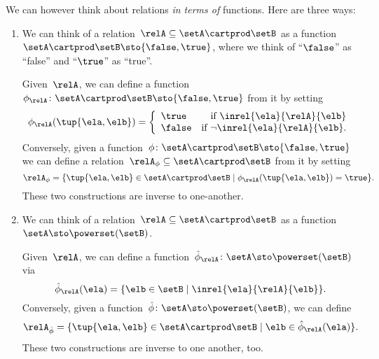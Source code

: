 \begin{remark}
    \label{re:rel-three-fun-descriptions}
    We can however think about relations \emph{in terms of} functions. Here are three ways:
    \begin{enumerate}
        \item We can think of a relation~$\relA \subseteq \setA \cartprod\setB$ as a function~$\setA \cartprod \setB \sto \{ \false, \true \}$, where we think of ``$\false$'' as ``false'' and ``$\true$'' as ``true''.
        
        Given~$\relA$, we can define a function~$\phi_{\relA} \colon \setA \cartprod \setB \sto \{ \false, \true \}$ from it by setting
        \begin{equation}
            \phi_{\relA}(\tup{\ela, \elb}) =
            \left
            \{\begin{array}{lr}
                  \true  & \text{if } \inrel{\ela}{\relA}{\elb}      \\
                  \false & \text{if } \neg\inrel{\ela}{\relA}{\elb}.
            \end{array}
            \right.
        \end{equation}
        Conversely, given a function~$\phi\colon \setA \cartprod \setB \sto \{ \false, \true \}$ we can define a relation~$\relA_{\phi} \subseteq \setA \cartprod \setB$ from it by setting
        \begin{equation}
            \relA_{\phi} = \{ \tup{\ela, \elb} \in \setA \cartprod \setB \mid \phi_{\relA}(\tup{\ela, \elb}) = \true \}.
        \end{equation}
        These two constructions are inverse to one-another.
        
        \item We can think of a relation~$\relA \subseteq \setA \cartprod \setB$ as a function~$\setA  \sto \powerset (\setB)$.
        
        Given~$\relA$, we can define a function~$\hat \phi_{\relA} \colon \setA \sto \powerset (\setB)$ via
        \begin{equation}
            \hat \phi_{\relA} (\ela) = \{ \elb \in \setB \mid \inrel{\ela}{\relA}{\elb}\}.
        \end{equation}
        Conversely, given a function~$\hat \phi \colon \setA \sto \powerset (\setB)$, we can define
        \begin{equation}
            \relA_{\hat \phi} = \{ \tup{\ela, \elb} \in \setA \cartprod \setB \mid \elb \in \hat \phi_{\relA}(\ela)   \}.
        \end{equation}
        These two constructions are inverse to one another, too.
        

\end{enumerate}
\end{remark}
